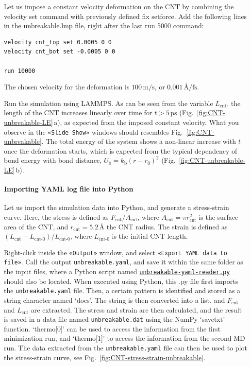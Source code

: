 \documentclass[9pt,tutorial]{livecoms}
\newcommand{\lmpcmd}[1]{\colorbox{listing}{\textcolor{command}{\small{#1}}}} %
\newcommand{\flecmd}[1]{\textcolor{command}{\texttt{#1}}} %
\newcommand{\guicmd}[1]{\textcolor{command}{\texttt{«#1»}}} %
\newcommand{\dwlcmd}[1]{\textcolor{download}{\texttt{#1}}} %
\newcommand{\filepath}{https://raw.githubusercontent.com/lammpstutorials/lammpstutorials-article/main/files/}
\begin{document}
Let us impose a constant velocity deformation on the CNT
by combining the \lmpcmd{velocity set} command with previously defined
\lmpcmd{fix setforce}.  Add the following lines in the \lmpcmd{unbreakable.lmp}
file, right after the last \lmpcmd{run 5000} command:
\begin{lstlisting}
velocity cnt_top set 0.0005 0 0
velocity cnt_bot set -0.0005 0 0

run 10000
\end{lstlisting}
The chosen velocity for the deformation is $100\,\text{m/s}$, or
$0.001\,\text{\AA{}/fs}$.

Run the simulation using LAMMPS.  As can be seen from the variable $L_\text{cnt}$, the length
of the CNT increases linearly over time for $t > 5\,\text{ps}$ (Fig.~\ref{fig:CNT-unbreakable-LE}\,a),
as expected from the imposed constant velocity.  What you observe in the \guicmd{Slide Show}
windows should resembles Fig.~\ref{fig:CNT-unbreakable}.  The total energy of the system
shows a non-linear increase with $t$ once the deformation starts, which is expected
from the typical dependency of bond energy with bond distance,
$U_\text{b} = k_\text{b} \left( r - r_0 \right)^2$ (Fig.~\ref{fig:CNT-unbreakable-LE}\,b).

\paragraph{Importing YAML log file into Python}

Let us import the simulation data into Python, and generate a stress-strain curve.
Here, the stress is defined as $F_\text{cnt}/A_\text{cnt}$,
where $A_\text{cnt} = \pi r_\text{cnt}^2$ is the surface area of the
CNT, and $r_\text{cnt}=5.2$\,\AA{} the CNT radius.  The strain is defined
as $(L_\text{cnt}-L_\text{cnt-0})/L_\text{cnt-0}$, where $L_\text{cnt-0}$ is the initial CNT length.

Right-click inside the \guicmd{Output} window, and select
\guicmd{Export YAML data to file}.  Call the output \flecmd{unbreakable.yaml}, and save
it within the same folder as the input files, where a Python script named
\href{\filepath tutorial2/unbreakable-yaml-reader.py}{\dwlcmd{unbreakable-yaml-reader.py}} should also
be located.  When executed using Python, this .py file first imports
the \flecmd{unbreakable.yaml} file.  Then, a certain pattern is
identified and stored as a string character named `docs'.  The string is
then converted into a list, and $F_\text{cnt}$ and $L_\text{cnt}$
are extracted.  The stress and strain are then calculated, and the result
is saved in a data file named \flecmd{unbreakable.dat} using
the NumPy `savetxt' function.  `thermo[0]' can be used to access the
information from the first minimization run, and `thermo[1]' to access the
information from the second MD run.  The data extracted from
the \flecmd{unbreakable.yaml} file can then be used to plot the stress-strain
curve, see Fig.~\ref{fig:CNT-stress-strain-unbreakable}.
\end{document}
